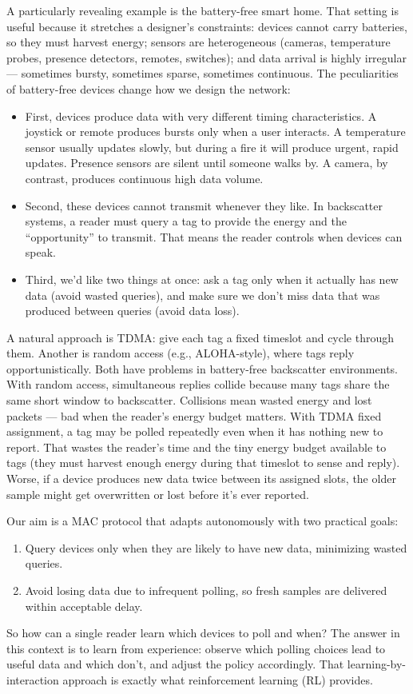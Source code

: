 A particularly revealing example is the battery-free smart home. That setting is useful because it stretches a designer’s constraints: devices cannot carry batteries, so they must harvest energy; sensors are heterogeneous (cameras, temperature probes, presence detectors, remotes, switches); and data arrival is highly irregular — sometimes bursty, sometimes sparse, sometimes continuous.
The peculiarities of battery-free devices change how we design the network:
\begin{itemize}
    \item First, devices produce data with very different timing characteristics. A joystick or remote produces bursts only when a user interacts. A temperature sensor usually updates slowly, but during a fire it will produce urgent, rapid updates. Presence sensors are silent until someone walks by. A camera, by contrast, produces continuous high data volume.
    \item Second, these devices cannot transmit whenever they like. In backscatter systems, a reader must query a tag to provide the energy and the “opportunity” to transmit. That means the reader controls when devices can speak.
    \item Third, we’d like two things at once: ask a tag only when it actually has new data (avoid wasted queries), and make sure we don’t miss data that was produced between queries (avoid data loss).
\end{itemize}
A natural approach is TDMA: give each tag a fixed timeslot and cycle through them. Another is random access (e.g., ALOHA-style), where tags reply opportunistically. Both have problems in battery-free backscatter environments.
With random access, simultaneous replies collide because many tags share the same short window to backscatter. Collisions mean wasted energy and lost packets — bad when the reader’s energy budget matters.
With TDMA fixed assignment, a tag may be polled repeatedly even when it has nothing new to report. That wastes the reader’s time and the tiny energy budget available to tags (they must harvest enough energy during that timeslot to sense and reply). Worse, if a device produces new data twice between its assigned slots, the older sample might get overwritten or lost before it’s ever reported.

Our aim is a MAC protocol that adapts autonomously with two practical goals:
\begin{enumerate}
    \item Query devices only when they are likely to have new data, minimizing wasted queries.
    \item Avoid losing data due to infrequent polling, so fresh samples are delivered within acceptable delay.
\end{enumerate}
So how can a single reader learn which devices to poll and when? The answer in this context is to learn from experience: observe which polling choices lead to useful data and which don’t, and adjust the policy accordingly. That learning-by-interaction approach is exactly what reinforcement learning (RL) provides.

